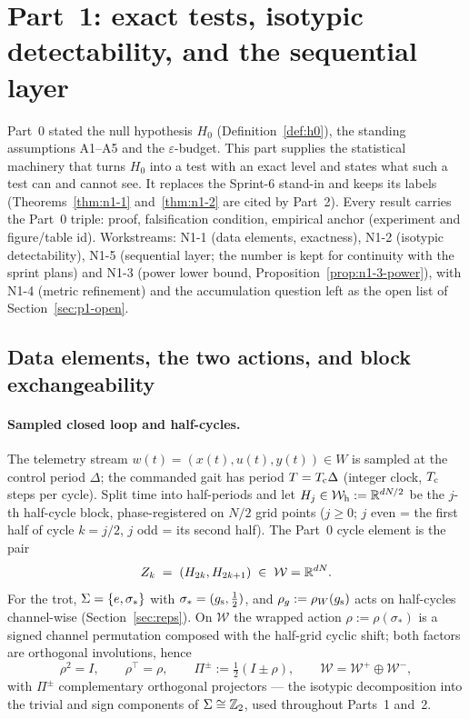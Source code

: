 \section{Part~1: exact tests, isotypic detectability, and the sequential layer}
\label{sec:part1core}

Part~0 stated the null hypothesis $H_0$ (Definition~\ref{def:h0}), the
standing assumptions A1--A5 and the $\varepsilon$-budget. This part supplies
the statistical machinery that turns $H_0$ into a test with an exact level
and states what such a test can and cannot see. It replaces the Sprint-6
stand-in and keeps its labels (Theorems~\ref{thm:n1-1} and~\ref{thm:n1-2}
are cited by Part~2). Every result carries the Part~0 triple: proof,
falsification condition, empirical anchor (experiment and figure/table id).
Workstreams: N1-1 (data elements, exactness), N1-2 (isotypic detectability),
N1-5 (sequential layer; the number is kept for continuity with the sprint
plans) and N1-3 (power lower bound, Proposition~\ref{prop:n1-3-power}), with
N1-4 (metric refinement) and the accumulation question left as the open list of
Section~\ref{sec:p1-open}.

\subsection{Data elements, the two actions, and block exchangeability}
\label{sec:p1-elements}

\paragraph{Sampled closed loop and half-cycles.}
The telemetry stream $w(t) = (x(t),u(t),y(t)) \in W$ is sampled at the
control period $\Delta$; the commanded gait has period $T = T_{\mathrm{c}}\Delta$
(integer clock, $T_{\mathrm{c}}$ steps per cycle). Split time into half-periods and let
$H_j \in \mathcal{W}_{\mathrm{h}} := \mathbb{R}^{d N/2}$ be the $j$-th half-cycle
block, phase-registered on $N/2$ grid points ($j \ge 0$; $j$ even = the
first half of cycle $k = j/2$, $j$ odd = its second half). The Part~0 cycle
element is the pair
\begin{equation}
  \label{eq:z-of-h}
  Z_k \;=\; (H_{2k}, H_{2k+1}) \;\in\; \mathcal{W} = \mathbb{R}^{dN}.
\end{equation}
For the trot, $\Sigma = \{e, \sigma_*\}$ with $\sigma_* = (g_{\mathrm{s}},\tfrac12)$,
and $\rho_g := \rho_{W}(g_{\mathrm{s}})$ acts on half-cycles channel-wise (Section~\ref{sec:reps}).
On $\mathcal{W}$ the wrapped action $\rho := \rho(\sigma_*)$ is a signed
channel permutation composed with the half-grid cyclic shift; both factors
are orthogonal involutions, hence
\begin{equation}
  \label{eq:rho-involution}
  \rho^{2} = I, \qquad \rho^{\top} = \rho, \qquad
  \Pi^{\pm} := \tfrac12 (I \pm \rho), \qquad
  \mathcal{W} = \mathcal{W}^{+} \oplus \mathcal{W}^{-},
\end{equation}
with $\Pi^{\pm}$ complementary orthogonal projectors --- the isotypic
decomposition into the trivial and sign components of $\Sigma \cong
\mathbb{Z}_2$, used throughout Parts~1 and~2.


